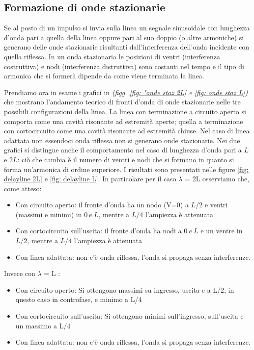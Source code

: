 \documentclass[journal]{IEEEtran}
\begin{document}
\subsection{Formazione di onde stazionarie}

Se al posto di un impulso si invia sulla linea un segnale sinusoidale con lunghezza d'onda pari a quella della linea oppure pari al suo doppio (o altre armoniche) si generano delle onde stazionarie risultanti dall'interferenza dell'onda incidente con quella riflessa. 
In un onda stazionaria le posizioni di ventri (interferenza costruttiva) e nodi (interferenza distruttiva) sono costanti nel tempo e il tipo di armonica che si formerà dipende da come viene terminata la linea.



Prendiamo ora in esame i grafici in \textit{(figg. \ref{fig: "onde staz 2L} e \ref{fig: onde staz L})} che mostrano l'andamento teorico di fronti d'onda di onde stazionarie nelle tre possibili configurazioni della linea.
La linea con terminazione a circuito aperto si comporta come una cavità risonante ad estremità aperte; quella a terminazione con cortocircuito come una cavità risonante ad estremità chiuse. Nel caso di linea adattata non essendoci onda riflessa non si generano onde stazionarie. Nei due grafici si distingue anche il comportamento nel caso di lunghezza d'onda pari a $L$ e $2L$: ciò che cambia è il numero di ventri e nodi che si formano in quanto si forma un'armonica di ordine superiore. I risultati sono presentati nelle figure \ref{fig: delayline 2L} e \ref{fig: delayline L}. In particolare per il caso $\lambda$ = 2L osserviamo che, come atteso:
\begin{itemize}
    \item Con circuito aperto: il fronte d'onda ha un nodo (V=0) a $L/2$ e ventri (massimi e minimi) in $0 \ e\ L$, mentre a $L/4$ l'ampiezza è attenuata 
    \item Con cortocircuito sull'uscita: il fronte d'onda ha nodi a $0\ e\ L$ e un ventre in $L/2$, mentre a $L/4$ l'ampiezza è attenuata
    \item Con linea adattata: non c'è onda riflessa, l'onda si propaga senza interferenze.
\end{itemize}
Invece con $\lambda$ = L :
\begin{itemize}
    \item Con circuito aperto: Si ottengono massimi su ingresso, uscita e a L/2, in questo caso in controfase, e minimo a L/4
    \item Con cortocircuito sull'uscita: Si ottengono minimi sull'ingresso, sull'uscita e un massimo a L/4
    \item Con linea adattata: non c'è onda riflessa, l'onda si propaga senza interferenze.
\end{itemize}
\end{document}
